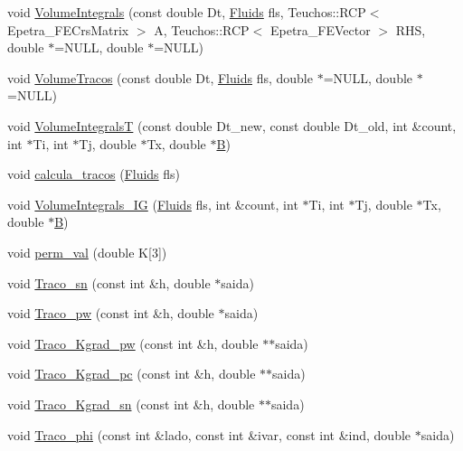 \begin{DoxyCompactItemize}
\item 
void \hyperlink{classDG__Elem_a166b7ad0ea852f703f65661c14b5c713}{Volume\+Integrals} (const double Dt, \hyperlink{classFluids}{Fluids} fls, Teuchos\+::\+R\+CP$<$ Epetra\+\_\+\+F\+E\+Crs\+Matrix $>$ A, Teuchos\+::\+R\+CP$<$ Epetra\+\_\+\+F\+E\+Vector $>$ R\+HS, double $\ast$=N\+U\+LL, double $\ast$=N\+U\+LL)
\item 
void \hyperlink{classDG__Elem_a84fab76e27b414367eb553f9d4841889}{Volume\+Tracos} (const double Dt, \hyperlink{classFluids}{Fluids} fls, double $\ast$=N\+U\+LL, double $\ast$=N\+U\+LL)
\item 
void \hyperlink{classDG__Elem_a2a2a90dfc3c456b66f7e1890d0f236f2}{Volume\+IntegralsT} (const double Dt\+\_\+new, const double Dt\+\_\+old, int \&count, int $\ast$Ti, int $\ast$Tj, double $\ast$Tx, double $\ast$\hyperlink{ASPFunctions_8cpp_a57d673f8d6833fb7a7aced326df10ca9}{B})
\item 
void \hyperlink{classDG__Elem_a64d352e6b9eeeeca73368a9ef92a94c2}{calcula\+\_\+tracos} (\hyperlink{classFluids}{Fluids} fls)
\item 
void \hyperlink{classDG__Elem_a3fc71dbfe141c0d42dc8ceff8f0ef8ce}{Volume\+Integrals\+\_\+\+IG} (\hyperlink{classFluids}{Fluids} fls, int \&count, int $\ast$Ti, int $\ast$Tj, double $\ast$Tx, double $\ast$\hyperlink{ASPFunctions_8cpp_a57d673f8d6833fb7a7aced326df10ca9}{B})
\item 
void \hyperlink{classDG__Elem_a699a198b44d02b1394229e623cd6632d}{perm\+\_\+val} (double K\mbox{[}3\mbox{]})
\item 
void \hyperlink{classDG__Elem_a4b5b26372a103e9f10c9d518419d4fd1}{Traco\+\_\+sn} (const int \&h, double $\ast$saida)
\item 
void \hyperlink{classDG__Elem_ab57a34a01c448785d8a887e51e7ab331}{Traco\+\_\+pw} (const int \&h, double $\ast$saida)
\item 
void \hyperlink{classDG__Elem_ae98efe920078bc5fd18eceee997d44a2}{Traco\+\_\+\+Kgrad\+\_\+pw} (const int \&h, double $\ast$$\ast$saida)
\item 
void \hyperlink{classDG__Elem_ad288d45acae59787b21a35b38fe47b10}{Traco\+\_\+\+Kgrad\+\_\+pc} (const int \&h, double $\ast$$\ast$saida)
\item 
void \hyperlink{classDG__Elem_ae64a1118040aad9dd3c18ac68b2d5d4f}{Traco\+\_\+\+Kgrad\+\_\+sn} (const int \&h, double $\ast$$\ast$saida)
\item 
void \hyperlink{classDG__Elem_aa97824992d60c2a7b5506e5d660dc7a1}{Traco\+\_\+phi} (const int \&lado, const int \&ivar, const int \&ind, double $\ast$saida)
$$
\end{DoxyCompactItemize}
